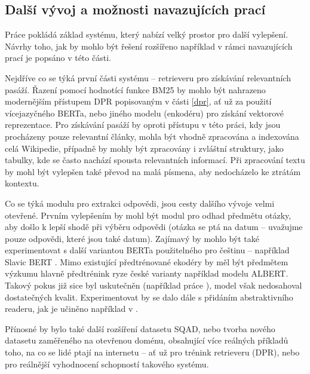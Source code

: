 \subsection{Další vývoj a možnosti navazujících prací}
Práce pokládá základ systému, který nabízí velký prostor pro další vylepšení. Návrhy toho, jak by mohlo být řešení rozšířeno například v rámci navazujících prací je popsáno v této části.\par
Nejdříve co se týká první části systému -- retrieveru pro získávání relevantních pasáží. Řazení pomocí hodnotící funkce BM25 by mohlo být nahrazeno modernějším přístupem DPR popisovaným v části \ref{dpr}, ať už za použití vícejazyčného BERTa, nebo jiného modelu (enkodéru) pro získání vektorové reprezentace. Pro získávání pasáží by oproti přístupu v této práci, kdy jsou procházeny pouze relevantní články, mohla být vhodně zpracována a indexována celá Wikipedie, případně by mohly být zpracovány i zvláštní struktury, jako tabulky, kde se často nachází spousta relevantních informací. Při zpracování textu by mohl být vylepšen také převod na malá písmena, aby nedocházelo ke ztrátám kontextu.\par
Co se týká modulu pro extrakci odpovědi, jsou cesty dalšího vývoje velmi otevřené. Prvním vylepšením by mohl být modul pro odhad předmětu otázky, aby došlo k lepší shodě při výběru odpovědi (otázka se ptá na datum -- uvažujme pouze odpovědi, které jsou také datum). Zajímavý by mohlo být také experimentovat s další variantou BERTa použitelného pro češtinu -- například Slavic BERT \cite{slavicBERT}. Mimo existující předtrénované ekodéry by měl být předmětem výzkumu hlavně předtrénink ryze české varianty například modelu ALBERT. Takový pokus již sice byl uskutečněn (například práce \cite{Zelina2020thesis}), model však nedosahoval dostatečných kvalit. Experimentovat by se dalo dále s přidáním abstraktivního readeru, jak je učiněno například v \cite{fajcik2021pruning}.\par
Přínosné by bylo také další rozšíření datasetu SQAD, nebo tvorba nového datasetu zaměřeného na otevřenou doménu, obsahující více reálných příkladů toho, na co se lidé ptají na internetu -- ať už pro trénink retrieveru (DPR), nebo pro reálnější vyhodnocení schopností takového systému.


